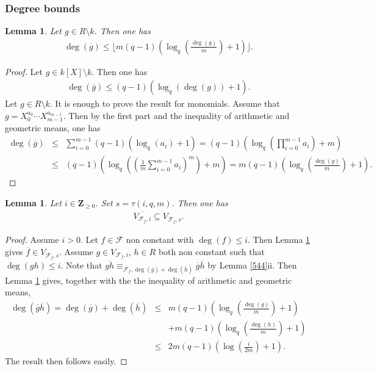 \documentclass{amsart}
\theoremstyle{plain}
\newtheorem{lemma}[theorem]{Lemma}
\theoremstyle{definition}
\begin{document}
\subsubsection{Degree bounds}
\begin{lemma} \label{5552}
Let $g \in R \setminus k$. Then one has
\begin{eqnarray*}
\deg( \overline{g} ) \leq \lfloor m(q-1) \left( \log_q(\frac{\deg(g)}{m})+1 \right) \rfloor.
\end{eqnarray*}
\end{lemma}
\begin{proof}
Let $g \in k[X] \setminus k$. Then one has
\begin{eqnarray*}
\deg( \overline{g} ) \leq (q-1) \left( \log_q( \deg(g)  )+ 1 \right).
\end{eqnarray*}
Let $g \in R \setminus k$. It is enough to prove the result for monomials. Assume that $g=X_0^{a_0}\cdots X_{m-1}^{a_{m-1}}$. Then by the first part and the inequality of arithmetic and geometric means, one has
\begin{eqnarray*}
\deg(\overline{g}) &\leq& \sum_{i=0}^{m-1} (q-1) \left( \log_q( a_i  )+ 1 \right) = (q-1) \left( \log_q( \prod_{i=0}^{m-1} a_i) +m \right) \\
&\leq&  (q-1) \left( \log_q( \left( \frac{1}{m} \sum_{i=0}^{m-1} a_i \right)^m) +m \right) = m(q-1) \left( \log_q(\frac{\deg(g)}{m})+1 \right). 
\end{eqnarray*}
\end{proof}

\begin{lemma} \label{5551}
Let $i \in {\mathbf{Z}}_{\geq 0}$. Set $s=\tau(i,q,m)$. 
Then one has
\begin{eqnarray*}
\overline{V_{\mathcal{F}_f,i}} \subseteq V_{\overline{\mathcal{F}}_f,s}.
\end{eqnarray*}
\end{lemma}
\begin{proof}
Assume $i>0$. Let $f \in \mathcal{F}$ non constant with $\deg(f)\leq i$. Then Lemma \ref{5552} gives $\overline{f} \in V_{\overline{\mathcal{F}}_f,s}$.
Assume $g \in V_{\mathcal{F}_f,i}$, $h \in R$ both non constant such that $\deg(gh) \leq i$. Note that $\overline{gh} \equiv_{\overline{\mathcal{F}}_f, \deg(\overline{g})+\deg(\overline{h})} \overline{g} \overline{h}$ by Lemma \ref{544}ii. Then Lemma \ref{5552} gives, together with the the inequality of arithmetic and geometric means,
\begin{eqnarray*}
\deg(\overline{g}\overline{h})=\deg(\overline{g})+\deg(\overline{h}) &\leq& m(q-1)  \left( \log_q(  \frac{\deg(g)}{m})+ 1 \right) \\
&& + m (q-1)  \left( \log_q(  \frac{\deg(h)}{m})+ 1 \right)\\
&\leq& 2 m(q-1) \left(\log( \frac{i}{2m}  )+1 \right).
\end{eqnarray*}
The result then follows easily.
\end{proof}
\end{document}
